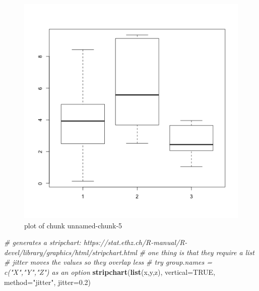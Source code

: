 \documentclass[]{article}
\newenvironment{Shaded}{}{}
\newcommand{\KeywordTok}[1]{\textcolor[rgb]{0.00,0.44,0.13}{\textbf{{#1}}}}
\newcommand{\DataTypeTok}[1]{\textcolor[rgb]{0.56,0.13,0.00}{{#1}}}
\newcommand{\FloatTok}[1]{\textcolor[rgb]{0.25,0.63,0.44}{{#1}}}
\newcommand{\StringTok}[1]{\textcolor[rgb]{0.25,0.44,0.63}{{#1}}}
\newcommand{\CommentTok}[1]{\textcolor[rgb]{0.38,0.63,0.69}{\textit{{#1}}}}
\newcommand{\OtherTok}[1]{\textcolor[rgb]{0.00,0.44,0.13}{{#1}}}
\newcommand{\NormalTok}[1]{{#1}}
\begin{document}
\begin{figure}[htbp]
\centering
\includegraphics{figure/unnamed-chunk-5-1.png}
\caption{plot of chunk unnamed-chunk-5}
\end{figure}

\begin{Shaded}
\begin{Highlighting}[]
\CommentTok{# generates a stripchart: https://stat.ethz.ch/R-manual/R-devel/library/graphics/html/stripchart.html}
\CommentTok{# one thing is that they require a list}
\CommentTok{# jitter moves the values so they overlap less}
\CommentTok{# try group.names = c("X","Y","Z") as an option}
\KeywordTok{stripchart}\NormalTok{(}\KeywordTok{list}\NormalTok{(x,y,z), }\DataTypeTok{vertical=}\OtherTok{TRUE}\NormalTok{, }\DataTypeTok{method=}\StringTok{"jitter"}\NormalTok{, }\DataTypeTok{jitter=}\FloatTok{0.2}\NormalTok{)}
\end{Highlighting}
\end{Shaded}
\end{document}
